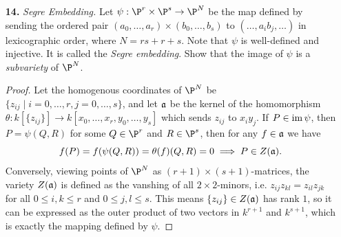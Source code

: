 \documentclass[a4paper]{article}
\begin{document}
\begin{enumerate} [label=\textbf{\arabic*.}, leftmargin=0cm]
\begin{proof}
\begin{itemize} [leftmargin=0cm]
                  \item[(d)] Let $(S, T)$ and $(X, Y, Z, W)$ be homogenous coordinates of $\P^1$ and $\P^3$, respectively. Then, the $3$-uple embedding of $\P^1$ in $\P^3$ is given by
                        \begin{equation*}
                            (S, T) \mapsto (S^3, S^2 T, ST^2, T^3).
                        \end{equation*}
                        Let $Y$ be the twisted cubic curve in $\A^3$ and let $\overline{Y}$ be its projective closure in $\P^3$, then we have
                        \begin{equation*}
                            \varphi_3^{-1}(Y) = \left\{ \bigg( \frac{u}{v}, \frac{u^2}{v^2}, \frac{u^3}{v^3}, 1 \bigg) \bigg| u, v \in k, ~ v \neq 0 \right\} \implies \overline{Y} = \{ (u^3, u^2v, uv^2, v^3) \mid u, v \in k \}.
                        \end{equation*}
              \end{itemize}
          \end{proof}


    \item[\textbf{14.}] \textit{Segre Embedding.} Let $\psi : \P^r \times \P^s \to \P^N$ be the map defined by sending the ordered pair $(a_0, \dots, a_r) \times (b_0, \dots, b_s)$ to $(\dots, a_i b_j, \dots)$ in lexicographic order, where $N = rs + r + s$. Note that $\psi$ is well-defined and injective. It is called the \textit{Segre embedding}. Show that the image of $\psi$ is a \textit{subvariety} of $\P^N$.

          \begin{proof}
              Let the homogenous coordinates of $\P^N$ be $\{ z_{ij} \mid i = 0, \dots, r, j = 0, \dots, s \}$, and let $\mathfrak{a}$ be the kernel of the homomorphism $\theta : k[\{ z_{ij} \}] \to k[x_0, \dots, x_r, y_0, \dots, y_s]$ which sends $z_{ij}$ to $x_i y_j$. If $P \in \operatorname{im}{\psi}$, then $P = \psi(Q, R)$ for some $Q \in \P^r$ and $R \in \P^s$, then for any $f \in \mathfrak{a}$ we have
              \begin{equation*}
                  f(P) = f(\psi(Q, R)) = \theta(f)(Q, R) = 0 \implies P \in Z(\mathfrak{a}).
              \end{equation*}
              Conversely, viewing points of $\P^N$ as $(r + 1)\times(s + 1)$-matrices, the variety $Z(\mathfrak{a})$ is defined as the vanshing of all $2\times2$-minors, i.e. $z_{ij}z_{kl} = z_{il}z_{jk}$ for all $0 \leq i, k \leq r$ and $0 \leq j, l \leq s$. This means $\{ z_{ij} \} \in Z(\mathfrak{a})$ has rank $1$, so it can be expressed as the outer product of two vectors in $k^{r + 1}$ and $k^{s + 1}$, which is exactly the mapping defined by $\psi$.
          \end{proof}


\end{enumerate}
\end{document}
